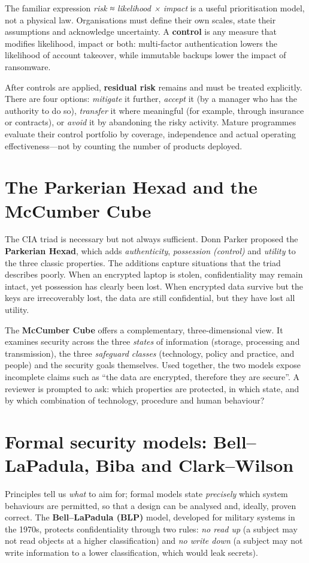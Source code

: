 The familiar expression \emph{risk ≈ likelihood × impact} is a useful prioritisation model, not a physical law. Organisations must define their own scales, state their assumptions and acknowledge uncertainty. A \textbf{control} is any measure that modifies likelihood, impact or both: multi-factor authentication lowers the likelihood of account takeover, while immutable backups lower the impact of ransomware.

After controls are applied, \textbf{residual risk} remains and must be treated explicitly. There are four options: \emph{mitigate} it further, \emph{accept} it (by a manager who has the authority to do so), \emph{transfer} it where meaningful (for example, through insurance or contracts), or \emph{avoid} it by abandoning the risky activity. Mature programmes evaluate their control portfolio by coverage, independence and actual operating effectiveness—not by counting the number of products deployed.

\section{The Parkerian Hexad and the McCumber Cube}\label{sec:1.6}
The CIA triad is necessary but not always sufficient. Donn Parker proposed the \textbf{Parkerian Hexad}, which adds \emph{authenticity}, \emph{possession (control)} and \emph{utility} to the three classic properties. The additions capture situations that the triad describes poorly. When an encrypted laptop is stolen, confidentiality may remain intact, yet possession has clearly been lost. When encrypted data survive but the keys are irrecoverably lost, the data are still confidential, but they have lost all utility.

The \textbf{McCumber Cube} offers a complementary, three-dimensional view. It examines security across the three \emph{states} of information (storage, processing and transmission), the three \emph{safeguard classes} (technology, policy and practice, and people) and the security goals themselves. Used together, the two models expose incomplete claims such as ``the data are encrypted, therefore they are secure''. A reviewer is prompted to ask: which properties are protected, in which state, and by which combination of technology, procedure and human behaviour?

\section{Formal security models: Bell–LaPadula, Biba and Clark–Wilson}\label{sec:1.7}
Principles tell us \emph{what} to aim for; formal models state \emph{precisely} which system behaviours are permitted, so that a design can be analysed and, ideally, proven correct. The \textbf{Bell–LaPadula (BLP)} model, developed for military systems in the 1970s, protects confidentiality through two rules: \emph{no read up} (a subject may not read objects at a higher classification) and \emph{no write down} (a subject may not write information to a lower classification, which would leak secrets).


